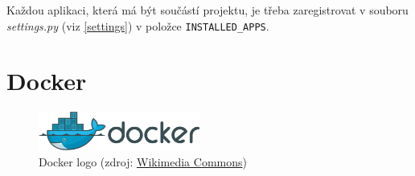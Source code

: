 Každou aplikaci, která má být součástí projektu, je třeba zaregistrovat v souboru \textit{settings.py} (viz \ref{settings}) v položce \texttt{INSTALLED\_APPS}.

\section{Docker}
\label{docker}

\begin{figure}[H] \centering
      \includegraphics[width=150pt]{./pictures/Docker_(container_engine)_logo.png}
      \caption[Docker logo]{Docker logo (zdroj:
\href{https://commons.wikimedia.org/wiki/File:Docker_(container_engine)_logo.png}{Wikimedia Commons})}
      \label{fig:docker}
  \end{figure}


